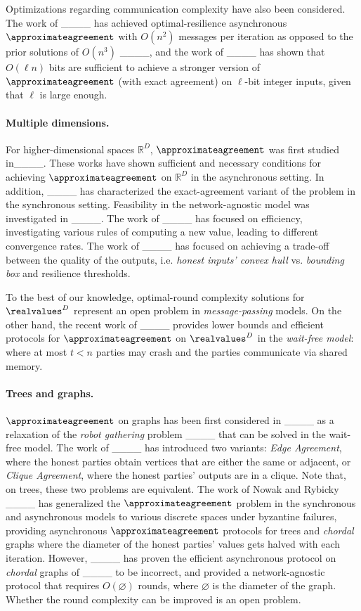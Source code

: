 Optimizations regarding communication complexity have also been considered. The work of ____ has achieved optimal-resilience asynchronous $\approximateagreement$ with $O(n^2)$ messages per iteration as opposed to the prior solutions of $O(n^3)$ ____, and the work of ____ has shown that $O(\ell n)$ bits are sufficient to achieve a stronger version of $\approximateagreement$ (with exact agreement) on $\ell$-bit integer inputs, given that $\ell$ is large enough.


\paragraph{Multiple dimensions.} 
For higher-dimensional spaces $\mathbb{R}^D$, $\approximateagreement$ was first studied in____.
These works have shown sufficient and necessary conditions for achieving $\approximateagreement$ on $\mathbb{R}^D$ in the asynchronous setting. In addition, ____ has characterized the exact-agreement variant of the problem in the synchronous setting. Feasibility in the network-agnostic model was investigated in ____. The work of ____ has focused on efficiency, investigating various rules of computing a new value, leading to different convergence rates. 
The work of ____ has focused on achieving a trade-off between the quality of the outputs, i.e. \emph{honest inputs' convex hull} vs. \emph{bounding box} and resilience thresholds.

To the best of our knowledge, optimal-round complexity solutions for $\realvalues^D$ represent an open problem in \emph{message-passing} models. On the other hand, the recent work of ____ provides lower bounds and efficient protocols for $\approximateagreement$ on $\realvalues^D$ in the \emph{wait-free model}: where at most $t < n$ parties may crash and the parties communicate via shared memory.


\paragraph{Trees and graphs.} $\approximateagreement$ on graphs has been first considered in ____  as a relaxation of the \emph{robot gathering} problem ____ that can be solved in the wait-free model. The work of ____ has introduced two variants: \emph{Edge Agreement}, where the honest parties obtain vertices that are either the same or adjacent, or \emph{Clique Agreement}, where the honest parties' outputs are in a clique. Note that, on trees, these two problems are equivalent. The work of Nowak and Rybicky ____ has generalized the $\approximateagreement$ problem in the synchronous and asynchronous models to various discrete spaces under byzantine failures, providing asynchronous $\approximateagreement$ protocols for trees and \emph{chordal} graphs where the diameter of the honest parties' values gets halved with each iteration. However, ____ has proven the efficient asynchronous protocol on \emph{chordal} graphs of ____ to be incorrect, and provided a network-agnostic protocol that requires $O(\diameter)$ rounds, where $\diameter$ is the diameter of the graph. Whether the round complexity can be improved is an open problem.

